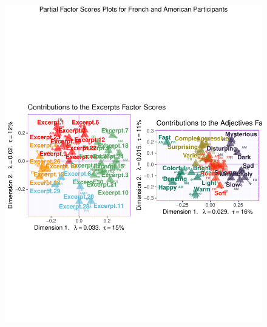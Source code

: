 \documentclass[
  english,
  man,floatsintext]{apa6}
\begin{document}
\begin{figure}

{\centering \includegraphics{Music-Descriptor-Space_files/figure-latex/mfasbs-1} 

}

\caption{ }\label{fig:mfasbs-1}
\end{figure}
\end{document}
